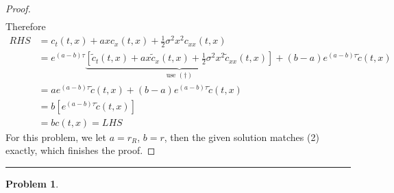 \documentclass[a4paper, 10pt]{article}
\theoremstyle{definition}
\newtheorem{problem}{Problem}
\theoremstyle{hSol}
\begin{document}
\begin{proof}
\begin{equation}
\begin{split}
	\end{split}
\end{equation}
Therefore
\begin{equation}
	\begin{split}
		RHS &= c_t(t,x) + a x c_x(t,x) + \frac{1}{2}\sigma^2 x^2 c_{xx}(t,x)\\
		&=e^{(a-b)\tau}\underbrace{\left[\widetilde{c}_t(t,x) + a x \widetilde{c}_x(t,x) + \frac{1}{2}\sigma^2 x^2 \widetilde{c}_{xx}(t,x)\right]}_{\text{use }(\dag)} + (b-a)e^{(a-b)\tau}\widetilde{c}(t,x) \\
		&= ae^{(a-b)\tau}\widetilde{c}(t,x) + (b-a)e^{(a-b)\tau}\widetilde{c}(t,x)\\
		&= b \left[e^{(a-b)\tau}\widetilde{c}(t,x)\right] \\
		&= bc(t,x) = LHS
	\end{split}
\end{equation}
For this problem, we let $a=r_R$, $b=r$, then the given solution matches (2) exactly, which finishes the proof.
\end{proof}
\newpage
\noindent\rule{16cm}{0.4pt}
\begin{problem} 
\end{problem}
\end{document}
